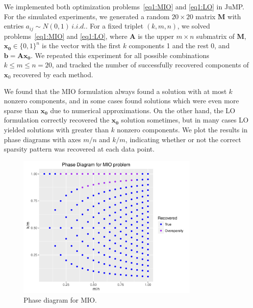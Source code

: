 \documentclass[12pt]{article}
\newcommand{\M}{\mathbf}
\newcommand{\1}{\mathds{1}}
\begin{document}
We implemented both optimization problems~\ref{eq1:MIO} and \ref{eq1:LO} in JuMP.  For the simulated experiments, we generated a random $20 \times 20$ matrix $\M M$ with entries $a_{ij} \sim N(0,1)~i.i.d.$.  For a fixed triplet $(k, m, n)$, we solved problems~\ref{eq1:MIO} and \ref{eq1:LO}, where $\M A$ is the upper $m \times n$ submatrix of $\M M$, $\M{x_0} \in \{0,1\}^n$ is the vector with the first $k$ components 1 and the rest 0, and $\M{b = Ax_0}$.   We repeated this experiment for all possible combinations $k \le m \le n = 20$, and tracked the number of successfully recovered components of $\M x_0$ recovered by each method.  

We found that the MIO formulation always found a solution with at most $k$ nonzero components, and in some cases found solutions which were even more sparse than $\M{x_0}$ due to numerical approximations.  On the other hand, the LO formulation correctly recovered the $\M{x_0}$ solution sometimes, but in many cases LO yielded solutions with greater than $k$ nonzero components.  We plot the results in phase diagrams with axes $m/n$ and $k/m$, indicating whether or not the correct sparsity pattern was recovered at each data point.  

\begin{figure}[tb]
  \centering
  \includegraphics[width=0.8\textwidth]{figures/phase_MIO}
  \caption{Phase diagram for MIO.}\label{fig:MIO_phase}
\end{figure}
\end{document}
